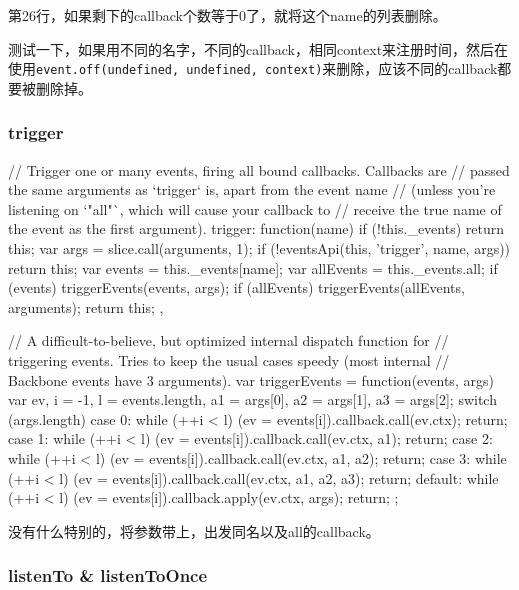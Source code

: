 第26行，如果剩下的callback个数等于0了，就将这个name的列表删除。


测试一下，如果用不同的名字，不同的callback，相同context来注册时间，然后在使用\lstinline$event.off(undefined, undefined, context)$来删除，应该不同的callback都要被删除掉。


\subsubsection{trigger}
\begin{JavaScript}
    // Trigger one or many events, firing all bound callbacks. Callbacks are
    // passed the same arguments as `trigger` is, apart from the event name
    // (unless you're listening on `"all"`, which will cause your callback to
    // receive the true name of the event as the first argument).
    trigger: function(name) {
      if (!this._events) return this;
      var args = slice.call(arguments, 1);
      if (!eventsApi(this, 'trigger', name, args)) return this;
      var events = this._events[name];
      var allEvents = this._events.all;
      if (events) triggerEvents(events, args);
      if (allEvents) triggerEvents(allEvents, arguments);
      return this;
    },
\end{JavaScript}

\begin{JavaScript}[优化，根据参数来判断怎么执行，哈哈]
  // A difficult-to-believe, but optimized internal dispatch function for
  // triggering events. Tries to keep the usual cases speedy (most internal
  // Backbone events have 3 arguments).
  var triggerEvents = function(events, args) {
    var ev, i = -1, l = events.length, a1 = args[0], a2 = args[1], a3 = args[2];
    switch (args.length) {
      case 0: while (++i < l) (ev = events[i]).callback.call(ev.ctx); return;
      case 1: while (++i < l) (ev = events[i]).callback.call(ev.ctx, a1); return;
      case 2: while (++i < l) (ev = events[i]).callback.call(ev.ctx, a1, a2); return;
      case 3: while (++i < l) (ev = events[i]).callback.call(ev.ctx, a1, a2, a3); return;
      default: while (++i < l) (ev = events[i]).callback.apply(ev.ctx, args); return;
    }
  };
\end{JavaScript}

没有什么特别的，将参数带上，出发同名以及all的callback。


\subsubsection{listenTo \& listenToOnce}

